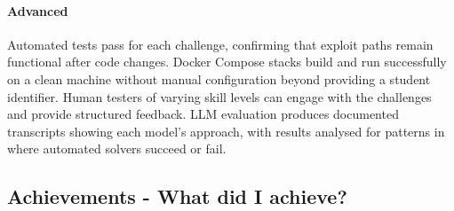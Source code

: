 \paragraph{\textbf{Advanced}} Automated tests pass for each challenge, confirming that exploit paths remain functional after code changes. Docker
Compose stacks build and run successfully on a clean machine without
manual configuration beyond providing a student identifier. Human
testers of varying skill levels can engage with the challenges and
provide structured feedback. LLM evaluation produces documented
transcripts showing each model's approach, with results analysed
for patterns in where automated solvers succeed or fail.

\subsection{Achievements - What did I achieve?}

